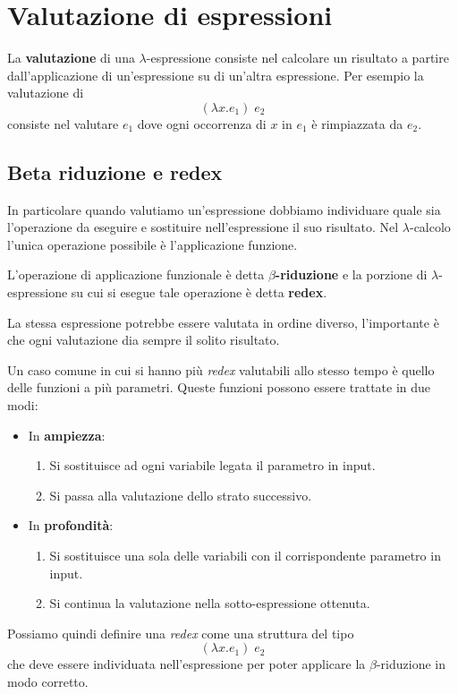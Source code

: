 \section{Valutazione di espressioni}
La \textbf{valutazione} di una $\lambda$-espressione consiste nel calcolare un risultato a partire dall'applicazione
di un'espressione su di un'altra espressione. Per esempio la valutazione di
\[ (\lambda x.e_1) \; e_2 \]
consiste nel valutare $e_1$ dove ogni occorrenza di $x$ in $e_1$ è rimpiazzata da $e_2$.

\subsection{Beta riduzione e redex}
In particolare quando valutiamo un'espressione dobbiamo individuare quale sia l'operazione da eseguire e sostituire
nell'espressione il suo risultato. Nel $\lambda$-calcolo l'unica operazione possibile è l'applicazione funzione.

L'operazione di applicazione funzionale è detta \textbf{$\beta$-riduzione} e la porzione di $\lambda$-espressione su
cui si esegue tale operazione è detta \textbf{redex}.

La stessa espressione potrebbe essere valutata in ordine diverso, l'importante è che ogni valutazione dia sempre il
solito risultato.

Un caso comune in cui si hanno più \emph{redex} valutabili allo stesso tempo è quello delle funzioni a più parametri.
Queste funzioni possono essere trattate in due modi:
\begin{itemize}
	\item In \textbf{ampiezza}:
	      \begin{enumerate}
		      \item Si sostituisce ad ogni variabile legata il parametro in input.
		      \item Si passa alla valutazione dello strato successivo.
	      \end{enumerate}
	\item In \textbf{profondità}:
	      \begin{enumerate}
		      \item Si sostituisce una sola delle variabili con il corrispondente parametro in input.
		      \item Si continua la valutazione nella sotto-espressione ottenuta.
	      \end{enumerate}
\end{itemize}
Possiamo quindi definire una \emph{redex} come una struttura del tipo
\[ (\lambda x.e_1) \; e_2 \]
che deve essere individuata nell'espressione per poter applicare la $\beta$-riduzione in modo corretto.


